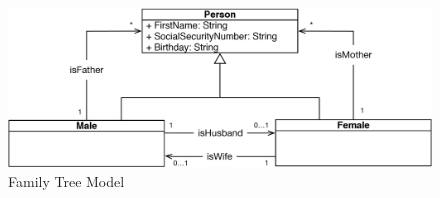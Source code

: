 \begin{figure}
\centering
\includegraphics[width=\linewidth]{Abschnitte/Abbildungen/Grafiken/Family-Tree-Model}
\caption{Family Tree Model}
\label{fig:Family-Tree-Model}
\end{figure}
